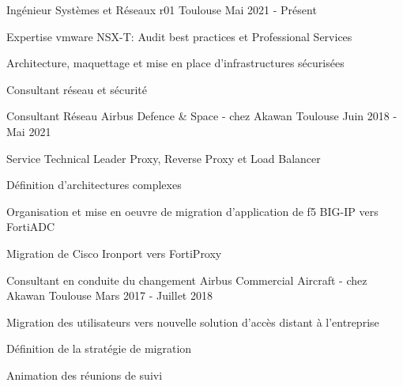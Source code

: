

\begin{cventries}

  \cventry
    {Ingénieur Systèmes et Réseaux} %
    {r01} %
    {Toulouse} %
    {Mai 2021 - Présent} %
    {
      \begin{cvitems} %
        \item {Expertise vmware NSX-T: Audit best practices et Professional Services}
        \item {Architecture, maquettage et mise en place d'infrastructures sécurisées}
        \item {Consultant réseau et sécurité}
      \end{cvitems}
    }

  \cventry
    {Consultant Réseau} %
    {Airbus Defence \& Space - chez Akawan} %
    {Toulouse} %
    {Juin 2018 - Mai 2021} %
    {
      \begin{cvitems} %
        \item {Service Technical Leader Proxy, Reverse Proxy et Load Balancer}
        \item {Définition d'architectures complexes}
        \item {Organisation et mise en oeuvre de migration d'application de f5 BIG-IP vers FortiADC}
        \item {Migration de Cisco Ironport vers FortiProxy}
      \end{cvitems}
    }

  \cventry
    {Consultant en conduite du changement} %
    {Airbus Commercial Aircraft - chez Akawan} %
    {Toulouse} %
    {Mars 2017 - Juillet 2018} %
    {
      \begin{cvdoubleitems} %
        \item {Migration des utilisateurs vers nouvelle solution d'accès distant à l'entreprise}
        \item {Définition de la stratégie de migration}
        \item {Animation des réunions de suivi}
      \end{cvdoubleitems}
    }


\end{cventries}
